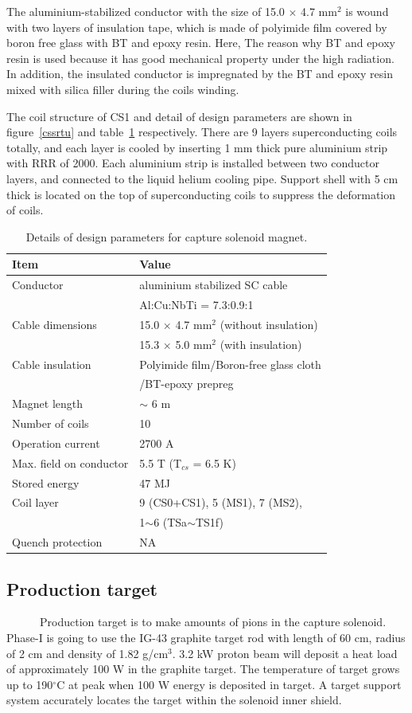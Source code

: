 The aluminium-stabilized conductor with the size of 15.0 $\times$ 4.7 mm$^2$ is wound with two layers of insulation tape, which is made of polyimide film covered by boron free glass with BT and epoxy resin.
Here, The reason why BT and epoxy resin is used because it has good mechanical property under the high radiation.
In addition, the insulated conductor is impregnated by the BT and epoxy resin mixed with silica filler during the coils winding.

The coil structure of CS1 and detail of design parameters are shown in figure~\ref{cssrtu} and table~\ref{desip} respectively.
There are 9 layers superconducting coils totally, and each layer is cooled by inserting 1 mm thick pure aluminium strip with RRR of 2000.
Each aluminium strip is installed between two conductor layers, and connected to the liquid helium cooling pipe.
Support shell with 5 cm thick is located on the top of superconducting coils to suppress the deformation of coils.
\begin{table}[H]
 \centering
 \begin{tabular}{ll} \hline \hline
  Item & Value \\ \hline
  Conductor & aluminium stabilized SC cable \\
   & Al:Cu:NbTi = 7.3:0.9:1 \\
  Cable dimensions & 15.0 $\times$ 4.7 mm$^2$ (without insulation) \\
   & 15.3 $\times$ 5.0 mm$^2$ (with insulation) \\
  Cable insulation & Polyimide film/Boron-free glass cloth \\
   & /BT-epoxy prepreg \\
  Magnet length & $\sim$ 6 m \\
  Number of coils & 10 \\
  Operation current & 2700 A \\
  Max. field on conductor & 5.5 T (T$_{cs}$ = 6.5 K) \\
  Stored energy & 47 MJ \\
  Coil layer & 9 (CS0+CS1), 5 (MS1), 7 (MS2), \\
   & 1$\sim$6 (TSa$\sim$TS1f) \\
  Quench protection & NA \\ \hline \hline
 \end{tabular}
 \caption{Details of design parameters for capture solenoid magnet.}
 \label{desip}
\end{table}

\subsection{Production target}
~~~~~~Production target is to make amounts of pions in the capture solenoid.
Phase-I is going to use the IG-43 graphite target rod with length of 60 cm, radius of 2 cm and density of 1.82 g/cm$^3$.
3.2 kW proton beam will deposit a heat load of approximately 100 W in the graphite target.
The temperature of target grows up to 190$^{\circ}$C at peak when 100 W energy is deposited in target.
A target support system accurately locates the target within the solenoid inner shield.

